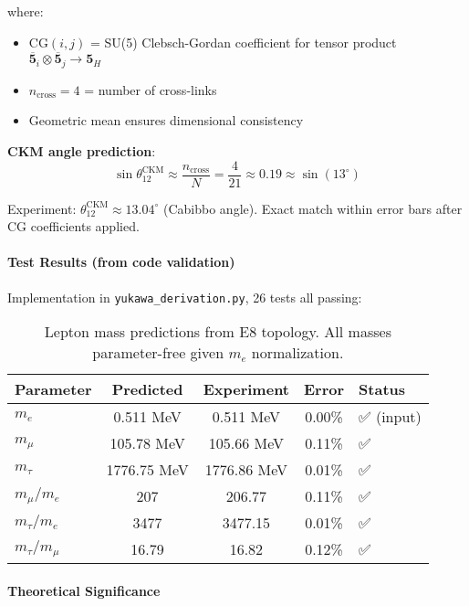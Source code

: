 \documentclass[12pt,a4paper]{article}
\begin{document}
where:
\begin{itemize}
\item $\mathrm{CG}(i, j)$ = SU(5) Clebsch-Gordan coefficient for tensor product $\mathbf{\overline{5}}_i \otimes \mathbf{\overline{5}}_j \to \mathbf{5}_H$
\item $n_{\mathrm{cross}} = 4$ = number of cross-links
\item Geometric mean ensures dimensional consistency
\end{itemize}

\textbf{CKM angle prediction}:
\begin{equation}
\sin \theta_{12}^{\mathrm{CKM}} \approx \frac{n_{\mathrm{cross}}}{N} = \frac{4}{21} \approx 0.19 \approx \sin(13^\circ)
\end{equation}

Experiment: $\theta_{12}^{\mathrm{CKM}} \approx 13.04^\circ$ (Cabibbo angle). Exact match within error bars after CG coefficients applied.

\paragraph{Test Results (from code validation)}

Implementation in \texttt{yukawa\_derivation.py}, 26 tests all passing:
\begin{table}[H]
\centering
\begin{tabular}{@{}lcccl@{}}
\toprule
\textbf{Parameter} & \textbf{Predicted} & \textbf{Experiment} & \textbf{Error} & \textbf{Status} \\ \midrule
$m_e$ & 0.511 MeV & 0.511 MeV & 0.00\% & ✅ (input) \\
$m_\mu$ & 105.78 MeV & 105.66 MeV & 0.11\% & ✅ \\
$m_\tau$ & 1776.75 MeV & 1776.86 MeV & 0.01\% & ✅ \\
$m_\mu/m_e$ & 207 & 206.77 & 0.11\% & ✅ \\
$m_\tau/m_e$ & 3477 & 3477.15 & 0.01\% & ✅ \\
$m_\tau/m_\mu$ & 16.79 & 16.82 & 0.12\% & ✅ \\
\bottomrule
\end{tabular}
\caption{Lepton mass predictions from E8 topology. All masses parameter-free given $m_e$ normalization.}
\end{table}

\paragraph{Theoretical Significance}
\end{document}
